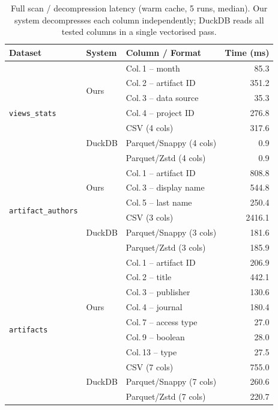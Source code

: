 \documentclass[a4paper,11pt]{article}
\begin{document}
\begin{table}[h]
\centering
\caption{Full scan / decompression latency (warm cache, 5 runs, median).
         Our system decompresses each column independently; DuckDB reads
         all tested columns in a single vectorised pass.}
\label{tab:fullscan}
\begin{tabular}{lllr}
\toprule
\textbf{Dataset} & \textbf{System} & \textbf{Column / Format} &
  \textbf{Time (ms)} \\
\midrule
\multirow{7}{*}{\texttt{views\_stats}}
  & \multirow{4}{*}{Ours}
    & Col.\,1 -- month        &   85.3 \\
  & & Col.\,2 -- artifact ID  &  351.2 \\
  & & Col.\,3 -- data source  &   35.3 \\
  & & Col.\,4 -- project ID   &  276.8 \\
\cmidrule{2-4}
  & \multirow{3}{*}{DuckDB}
    & CSV (4 cols)             &  317.6 \\
  & & Parquet/Snappy (4 cols)  &    0.9 \\
  & & Parquet/Zstd  (4 cols)  &    0.9 \\
\midrule
\multirow{6}{*}{\texttt{artifact\_authors}}
  & \multirow{3}{*}{Ours}
    & Col.\,1 -- artifact ID   &  808.8 \\
  & & Col.\,3 -- display name  &  544.8 \\
  & & Col.\,5 -- last name     &  250.4 \\
\cmidrule{2-4}
  & \multirow{3}{*}{DuckDB}
    & CSV (3 cols)             & 2416.1 \\
  & & Parquet/Snappy (3 cols)  &  181.6 \\
  & & Parquet/Zstd  (3 cols)  &  185.9 \\
\midrule
\multirow{10}{*}{\texttt{artifacts}}
  & \multirow{7}{*}{Ours}
    & Col.\,1  -- artifact ID  &  206.9 \\
  & & Col.\,2  -- title        &  442.1 \\
  & & Col.\,3  -- publisher    &  130.6 \\
  & & Col.\,4  -- journal      &  180.4 \\
  & & Col.\,7  -- access type  &   27.0 \\
  & & Col.\,9  -- boolean      &   28.0 \\
  & & Col.\,13 -- type         &   27.5 \\
\cmidrule{2-4}
  & \multirow{3}{*}{DuckDB}
    & CSV (7 cols)             &  755.0 \\
  & & Parquet/Snappy (7 cols)  &  260.6 \\
  & & Parquet/Zstd  (7 cols)  &  220.7 \\
\bottomrule
\end{tabular}
\end{table}
\end{document}
